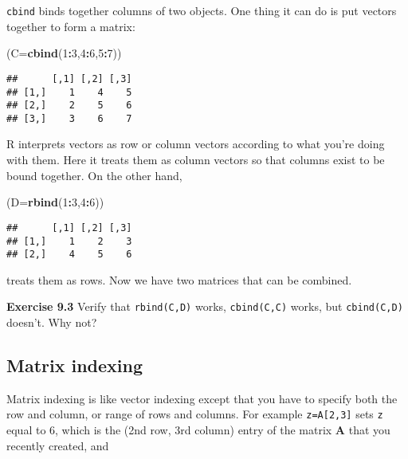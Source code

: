\documentclass[11pt,]{article}
\newenvironment{Shaded}{\begin{snugshade}}{\end{snugshade}}
\newcommand{\KeywordTok}[1]{\textcolor[rgb]{0.13,0.29,0.53}{\textbf{#1}}}
\newcommand{\DataTypeTok}[1]{\textcolor[rgb]{0.13,0.29,0.53}{#1}}
\newcommand{\DecValTok}[1]{\textcolor[rgb]{0.00,0.00,0.81}{#1}}
\newcommand{\OperatorTok}[1]{\textcolor[rgb]{0.81,0.36,0.00}{\textbf{#1}}}
\newcommand{\NormalTok}[1]{#1}
\begin{document}
\texttt{cbind} binds together columns of two objects. One thing it can
do is put vectors together to form a matrix:

\begin{Shaded}
\begin{Highlighting}[]
\NormalTok{(}\DataTypeTok{C=}\KeywordTok{cbind}\NormalTok{(}\DecValTok{1}\OperatorTok{:}\DecValTok{3}\NormalTok{,}\DecValTok{4}\OperatorTok{:}\DecValTok{6}\NormalTok{,}\DecValTok{5}\OperatorTok{:}\DecValTok{7}\NormalTok{))}
\end{Highlighting}
\end{Shaded}

\begin{verbatim}
##      [,1] [,2] [,3]
## [1,]    1    4    5
## [2,]    2    5    6
## [3,]    3    6    7
\end{verbatim}

R interprets vectors as row or column vectors according to what you're
doing with them. Here it treats them as column vectors so that columns
exist to be bound together. On the other hand,

\begin{Shaded}
\begin{Highlighting}[]
\NormalTok{(}\DataTypeTok{D=}\KeywordTok{rbind}\NormalTok{(}\DecValTok{1}\OperatorTok{:}\DecValTok{3}\NormalTok{,}\DecValTok{4}\OperatorTok{:}\DecValTok{6}\NormalTok{))}
\end{Highlighting}
\end{Shaded}

\begin{verbatim}
##      [,1] [,2] [,3]
## [1,]    1    2    3
## [2,]    4    5    6
\end{verbatim}

treats them as rows. Now we have two matrices that can be combined.

\textbf{Exercise 9.3} Verify that \texttt{rbind(C,D)} works,
\texttt{cbind(C,C)} works, but \texttt{cbind(C,D)} doesn't. Why not?

\subsection{Matrix indexing}\label{matrix-indexing}

Matrix indexing is like vector indexing except that you have to specify
both the row and column, or range of rows and columns. For example
\texttt{z=A{[}2,3{]}} sets \texttt{z} equal to 6, which is the (2nd row,
3rd column) entry of the matrix \textbf{A} that you recently created,
and
\end{document}

